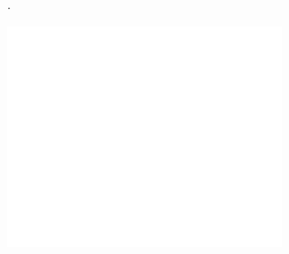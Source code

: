
\pagecolor{black}
.
\vspace{4cm}
\begin{center}
  \includegraphics[width=0.6\textwidth]{../general/logo_white.pdf}
\end{center}

\vspace*{2cm}
\begin{center}
  {\color{white} \Huge\docTitle}
\end{center}

\vspace*{1cm}
\begin{center}
  {\color{white} \Huge\productName}
\end{center}

\begin{center}
  {\color{white} \Huge\docSubTitle}
\end{center}

\afterpage{\nopagecolor}
\newpage

